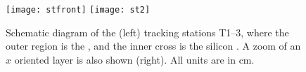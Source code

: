 \begin{figure}
  \begin{center}
    \texttt{[image: stfront]}
    \texttt{[image: st2]}
  \end{center}
  \caption[Diagram of the LHCb tracking stations T1--3]
  {
      Schematic diagram of the (left) tracking stations T1--3, where the outer region is the \ot,
      and the inner cross is the silicon \intr.
      A zoom of an $x$ oriented \intr layer is also shown (right).
      All units are in cm.
  }
  \label{fig:lhcb:tracking}
\end{figure}



